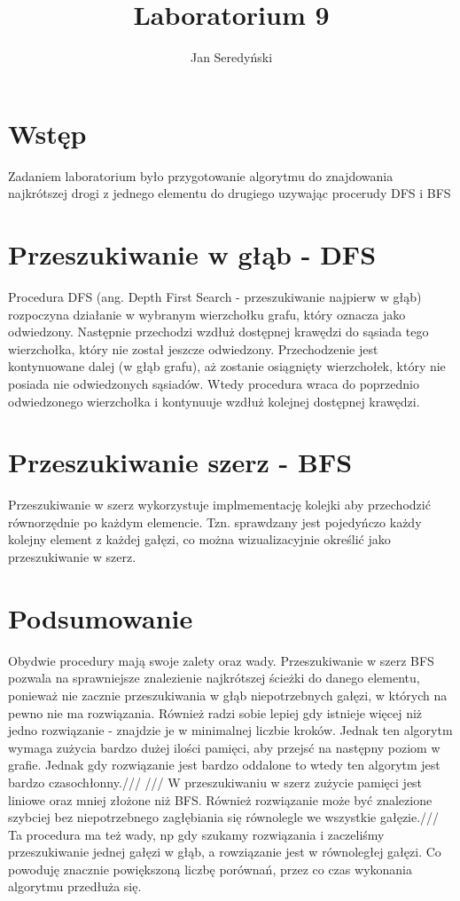\documentclass[11pt]{article}
\begin{document}
\title{Laboratorium 9}
\author{Jan Seredyński}
\maketitle

\section{Wstęp}
Zadaniem laboratorium było przygotowanie algorytmu do znajdowania najkrótszej drogi z jednego elementu do drugiego uzywając procerudy DFS i BFS

\section{Przeszukiwanie w głąb - DFS}
Procedura DFS (ang. Depth First Search - przeszukiwanie najpierw w głąb) rozpoczyna działanie w wybranym wierzchołku grafu, który oznacza jako odwiedzony. Następnie przechodzi wzdłuż dostępnej krawędzi do sąsiada tego wierzchołka, który nie został jeszcze odwiedzony. Przechodzenie jest kontynuowane dalej (w głąb grafu), aż zostanie osiągnięty wierzchołek, który nie posiada nie odwiedzonych sąsiadów. Wtedy procedura wraca do poprzednio odwiedzonego wierzchołka i kontynuuje wzdłuż kolejnej dostępnej krawędzi.


\section{Przeszukiwanie szerz - BFS}
Przeszukiwanie w szerz wykorzystuje implmementację kolejki aby przechodzić równorzędnie po każdym elemencie. Tzn. sprawdzany jest pojedyńczo każdy kolejny element z każdej gałęzi, co można wizualizacyjnie określić jako przeszukiwanie w szerz.


\section{Podsumowanie}
Obydwie procedury mają swoje zalety oraz wady. Przeszukiwanie w szerz BFS pozwala na sprawniejsze znalezienie najkrótszej ścieżki do danego elementu, ponieważ nie zacznie przeszukiwania w głąb niepotrzebnych gałęzi, w których na pewno nie ma rozwiązania. Również radzi sobie lepiej gdy istnieje więcej niż jedno rozwiązanie - znajdzie je w minimalnej liczbie kroków.
Jednak ten algorytm wymaga zużycia bardzo dużej ilości pamięci, aby przejsć na następny poziom w grafie. Jednak gdy rozwiązanie jest bardzo oddalone to wtedy ten algorytm jest bardzo czasochłonny.///
///
W przeszukiwaniu w szerz zużycie pamięci jest liniowe oraz mniej złożone niż BFS. Również rozwiązanie może być znalezione szybciej bez niepotrzebnego zagłębiania się równolegle we wszystkie gałęzie.///
Ta procedura ma też wady, np gdy szukamy rozwiązania i zaczeliśmy przeszukiwanie jednej gałęzi w głąb, a rowziązanie jest w równoległej gałęzi. Co powoduję znacznie powiększoną liczbę porównań, przez co czas wykonania algorytmu przedłuża się.
\end{document}
